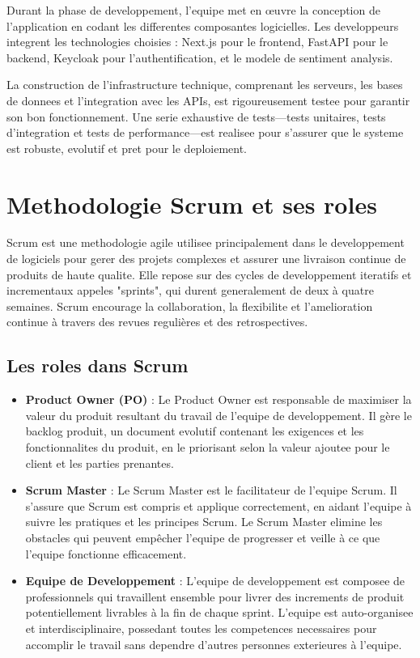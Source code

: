 Durant la phase de developpement, l'equipe met en œuvre la conception de l'application en codant les differentes composantes logicielles. Les developpeurs integrent les technologies choisies : Next.js pour le frontend, FastAPI pour le backend, Keycloak pour l'authentification, et le modele de sentiment analysis.

La construction de l'infrastructure technique, comprenant les serveurs, les bases de donnees et l'integration avec les APIs, est rigoureusement testee pour garantir son bon fonctionnement. Une serie exhaustive de tests—tests unitaires, tests d'integration et tests de performance—est realisee pour s'assurer que le systeme est robuste, evolutif et pret pour le deploiement.

\section{Methodologie Scrum et ses roles}

Scrum est une methodologie agile utilisee principalement dans le developpement de logiciels pour gerer des projets complexes et assurer une livraison continue de produits de haute qualite. Elle repose sur des cycles de developpement iteratifs et incrementaux appeles "sprints", qui durent generalement de deux à quatre semaines. Scrum encourage la collaboration, la flexibilite et l'amelioration continue à travers des revues regulières et des retrospectives.

\subsection{Les roles dans Scrum}

\begin{itemize}
    \item \textbf{Product Owner (PO)} : Le Product Owner est responsable de maximiser la valeur du produit resultant du travail de l'equipe de developpement. Il gère le backlog produit, un document evolutif contenant les exigences et les fonctionnalites du produit, en le priorisant selon la valeur ajoutee pour le client et les parties prenantes.
    
    \item \textbf{Scrum Master} : Le Scrum Master est le facilitateur de l'equipe Scrum. Il s'assure que Scrum est compris et applique correctement, en aidant l'equipe à suivre les pratiques et les principes Scrum. Le Scrum Master elimine les obstacles qui peuvent empêcher l'equipe de progresser et veille à ce que l'equipe fonctionne efficacement.
    
    \item \textbf{Equipe de Developpement} : L'equipe de developpement est composee de professionnels qui travaillent ensemble pour livrer des increments de produit potentiellement livrables à la fin de chaque sprint. L'equipe est auto-organisee et interdisciplinaire, possedant toutes les competences necessaires pour accomplir le travail sans dependre d'autres personnes exterieures à l'equipe.
\end{itemize}

